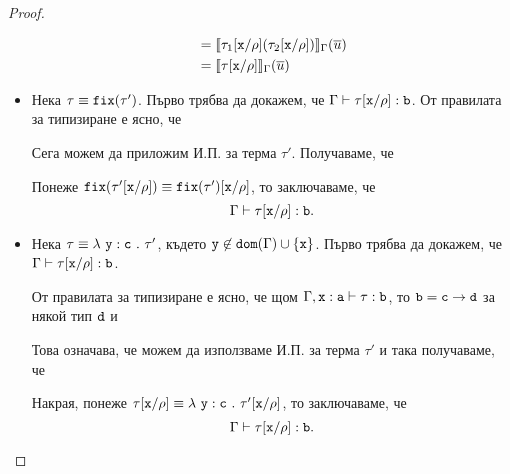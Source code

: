 \begin{proof}
\begin{itemize}
\begin{align*}
                                                                   & = \val{\tau_1\subst{x}{\rho}(\tau_2\subst{x}{\rho})}_\Gamma(\ov{u})\\
                                                                   & = \val{\tau\subst{x}{\rho}}_\Gamma(\ov{u})
    \end{align*}
  \item
    Нека $\tau \equiv \fix(\tau')$.
    Първо трябва да докажем, че $\Gamma \vdash \tau[\vv{x}/\rho] : \vv{b}$.
    От правилата за типизиране е ясно, че
    \begin{prooftree}
    \end{prooftree}
    Сега можем да приложим И.П. за терма $\tau'$. Получаваме, че
    \begin{prooftree}
    \end{prooftree}
    Понеже $\fix(\tau'\subst{x}{\rho}) \equiv \fix(\tau')\subst{x}{\rho}$, то заключаваме, че
    \[\Gamma \vdash \tau[\vv{x}/\rho] : \vv{b}.\]
  \item

    Нека $\tau \equiv \lamb{y}{c}{\tau'}$, където $\vv{y} \not\in \vv{dom}(\Gamma) \cup \{\vv{x}\}$.
    Първо трябва да докажем, че $\Gamma \vdash \tau[\vv{x}/\rho] : \vv{b}$.
    
    От правилата за типизиране е ясно, че щом $\Gamma, \type{x}{a} \vdash \tau : \vv{b}$, то
    $\vv{b} = \vv{c} \to \vv{d}$ за някой тип $\vv{d}$ и
    \begin{prooftree}
    \end{prooftree}
    Това означава, че можем да използваме И.П. за терма $\tau'$ и така получаваме, че
    \begin{prooftree}
    \end{prooftree}
    Накрая, понеже $\tau\subst{x}{\rho} \equiv \lamb{y}{c}{\tau'\subst{x}{\rho}}$, то
    заключаваме, че
    \[\Gamma \vdash \tau\subst{x}{\rho}:\vv{b}.\]


\end{itemize}
\end{proof}
